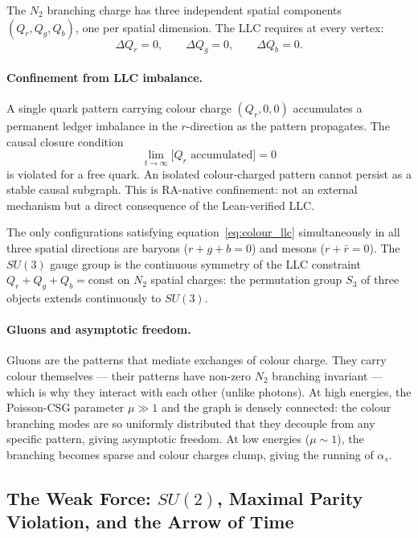 \documentclass[11pt,a4paper]{article}
\begin{document}
The $N_2$ branching charge has three independent spatial components
$(Q_r, Q_g, Q_b)$, one per spatial dimension. The LLC requires at every vertex:
\begin{equation}
  \Delta Q_r = 0, \qquad \Delta Q_g = 0, \qquad \Delta Q_b = 0.
  \label{eq:colour_llc}
\end{equation}

\paragraph{Confinement from LLC imbalance.}
A single quark pattern carrying colour charge $(Q_r, 0, 0)$ accumulates a
permanent ledger imbalance in the $r$-direction as the pattern propagates.
The causal closure condition
\begin{equation}
  \lim_{t\to\infty}\bigl[Q_r\text{ accumulated}\bigr] = 0
  \label{eq:causal_closure}
\end{equation}
is violated for a free quark. An isolated colour-charged pattern cannot persist
as a stable causal subgraph. This is RA-native confinement: not an external
mechanism but a direct consequence of the Lean-verified LLC.

The only configurations satisfying equation~\eqref{eq:colour_llc} simultaneously
in all three spatial directions are baryons ($r + g + b = 0$) and mesons
($r + \bar{r} = 0$). The $SU(3)$ gauge group is the continuous symmetry of
the LLC constraint $Q_r + Q_g + Q_b = \mathrm{const}$ on $N_2$ spatial charges:
the permutation group $S_3$ of three objects extends continuously to $SU(3)$.

\paragraph{Gluons and asymptotic freedom.}
Gluons are the patterns that mediate exchanges of colour charge. They carry
colour themselves --- their patterns have non-zero $N_2$ branching invariant
--- which is why they interact with each other (unlike photons). At high
energies, the Poisson-CSG parameter $\mu \gg 1$ and the graph is densely
connected: the colour branching modes are so uniformly distributed that they
decouple from any specific pattern, giving asymptotic freedom. At low energies
($\mu \sim 1$), the branching becomes sparse and colour charges clump,
giving the running of $\alpha_s$.

\subsection{The Weak Force: $SU(2)$, Maximal Parity Violation, and the Arrow of Time}
\end{document}

